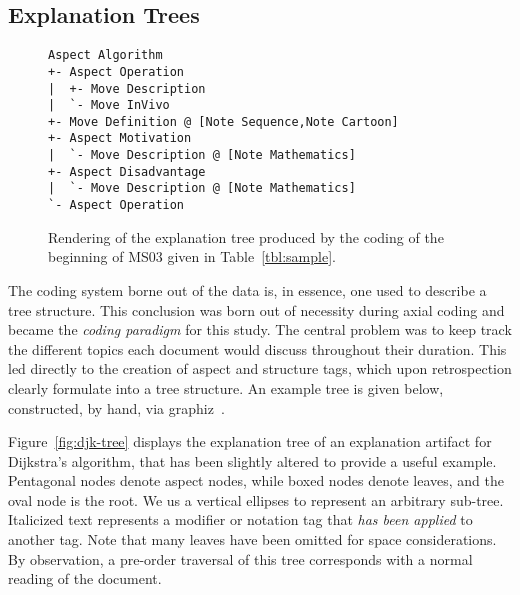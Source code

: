 \documentclass[sigconf]{acmart}
\begin{document}
\subsection{Explanation Trees}
\label{sec:res:xopTree}

% 

\begin{figure}
\begin{Verbatim}[fontsize=\small,xleftmargin=2ex]
Aspect Algorithm
+- Aspect Operation
|  +- Move Description
|  `- Move InVivo
+- Move Definition @ [Note Sequence,Note Cartoon]
+- Aspect Motivation
|  `- Move Description @ [Note Mathematics]
+- Aspect Disadvantage
|  `- Move Description @ [Note Mathematics]
`- Aspect Operation
\end{Verbatim}
\caption{Rendering of the explanation tree produced by the coding of the
beginning of MS03 given in Table~\ref{tbl:sample}.}
\label{fig:tree}
\end{figure}

The coding system borne out of the data is, in essence, one used to describe a
tree structure. This conclusion was born out of necessity during axial coding
and became the \emph{coding paradigm} for this study. The central problem was to
keep track the different topics each document would discuss throughout their
duration. This led directly to the creation of aspect and structure tags, which
upon retrospection clearly formulate into a tree structure. An
example tree is given below, constructed, by hand, via
graphiz~\cite{Ellson2002}.


Figure~\ref{fig:djk-tree} displays the explanation tree of an explanation
artifact for Dijkstra's algorithm, that has been slightly altered to provide a
useful example. Pentagonal nodes denote aspect nodes, while boxed nodes denote
leaves, and the oval node is the root. We us a vertical ellipses to represent an
arbitrary sub-tree. Italicized text represents a modifier or notation tag that
\emph{has been applied} to another tag. Note that many leaves have been omitted
for space considerations. By observation, a pre-order traversal of this tree
corresponds with a normal reading of the document.
\end{document}
